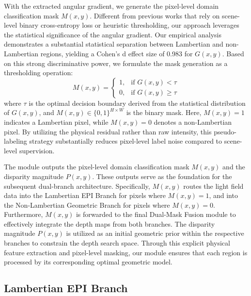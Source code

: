 \documentclass[lettersize,journal]{IEEEtran}
\begin{document}
With the extracted angular gradient, we generate the pixel-level domain classification mask $M(x,y)$. Different from previous works that rely on scene-level binary cross-entropy loss or heuristic thresholding, our approach leverages the statistical significance of the angular gradient. Our empirical analysis demonstrates a substantial statistical separation between Lambertian and non-Lambertian regions, yielding a Cohen's d effect size of 0.983 for $G(x,y)$. Based on this strong discriminative power, we formulate the mask generation as a thresholding operation:
\begin{equation} \label{eq:ch3_7}
M(x,y) = \begin{cases} 1, & \text{if } G(x,y) < \tau \\ 0, & \text{if } G(x,y) \ge \tau \end{cases}
\end{equation}
where $\tau$ is the optimal decision boundary derived from the statistical distribution of $G(x,y)$, and $M(x,y) \in \{0, 1\}^{H \times W}$ is the binary mask. Here, $M(x,y) = 1$ indicates a Lambertian pixel, while $M(x,y) = 0$ denotes a non-Lambertian pixel. By utilizing the physical residual rather than raw intensity, this pseudo-labeling strategy substantially reduces pixel-level label noise compared to scene-level supervision.

The module outputs the pixel-level domain classification mask $M(x,y)$ and the disparity magnitude $P(x,y)$. These outputs serve as the foundation for the subsequent dual-branch architecture. Specifically, $M(x,y)$ routes the light field data into the Lambertian EPI Branch for pixels where $M(x,y)=1$, and into the Non-Lambertian Geometric Branch for pixels where $M(x,y)=0$. Furthermore, $M(x,y)$ is forwarded to the final Dual-Mask Fusion module to effectively integrate the depth maps from both branches. The disparity magnitude $P(x,y)$ is utilized as an initial geometric prior within the respective branches to constrain the depth search space. Through this explicit physical feature extraction and pixel-level masking, our module ensures that each region is processed by its corresponding optimal geometric model.

\subsection{Lambertian EPI Branch}
\end{document}
